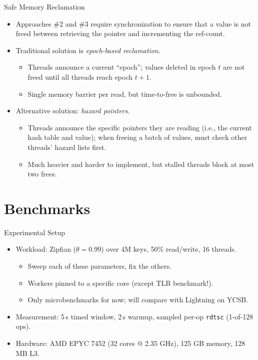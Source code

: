 \documentclass[10pt,aspectratio=169]{beamer}
\begin{document}
\begin{frame}{Safe Memory Reclamation}
    \begin{itemize}
        \item Approaches \#2 and \#3 require synchronization to ensure that a
        value is not freed between retrieving the pointer and incrementing the
        ref-count.
        \item Traditional solution is \emph{epoch-based reclamation}.
        \begin{itemize}
            \item Threads announce a current ``epoch''; values deleted in epoch
            $t$ are not freed until all threads reach epoch $t + 1$.
            \item Single memory barrier per read, but time-to-free is unbounded.
        \end{itemize}
        \item Alternative solution: \emph{hazard pointers}.
        \begin{itemize}
            \item Threads announce the specific pointers they are reading (i.e.,
            the current hash table and value); when freeing a batch of values,
            must check other threads' hazard lists first.
            \item Much heavier and harder to implement, but stalled threads
            block at most two frees.
        \end{itemize}
    \end{itemize}
\end{frame}

\section{Benchmarks}

\begin{frame}{Experimental Setup}
	\begin{itemize}
		\item Workload: Zipfian (\(\theta=0.99\)) over 4M keys, 50\% read/write,
        16 threads.
        \begin{itemize}
            \item Sweep each of these parameters, fix the others.
            \item Workers pinned to a specific core (except TLB benchmark!).
            \item Only microbenchmarks for now; will compare with Lightning on
            YCSB.
        \end{itemize}
        \item Measurement: 5\,s timed window, 2\,s warmup, sampled per-op
        \texttt{rdtsc} (1-of-128 ops).
		\item Hardware: AMD EPYC 7452 (32 cores @ 2.35 GHz), 125 GB memory, 128
        MB L3.
	\end{itemize}
\end{frame}
\end{document}
